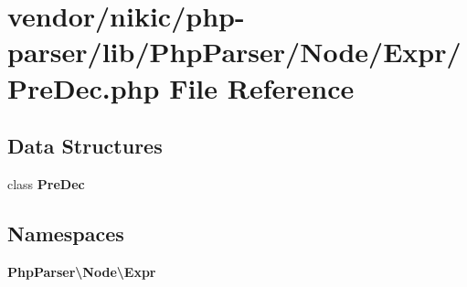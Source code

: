 \section{vendor/nikic/php-\/parser/lib/\+Php\+Parser/\+Node/\+Expr/\+Pre\+Dec.php File Reference}
\label{_pre_dec_8php}
\subsection*{Data Structures}
\begin{DoxyCompactItemize}
\item 
class {\bf Pre\+Dec}
\end{DoxyCompactItemize}
\subsection*{Namespaces}
\begin{DoxyCompactItemize}
\item 
 {\bf Php\+Parser\textbackslash{}\+Node\textbackslash{}\+Expr}
\end{DoxyCompactItemize}
